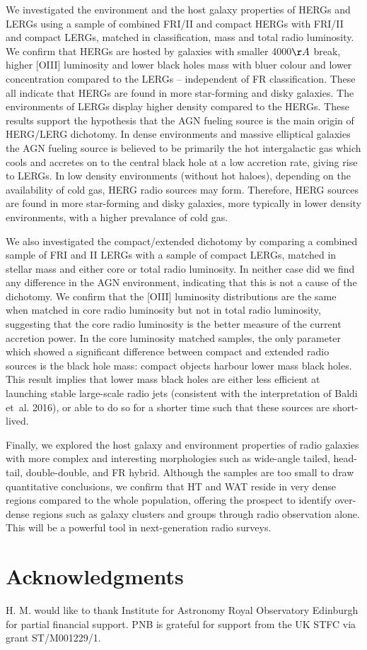 \documentclass[usenatbib]{mn2e}
\begin{document}
We investigated the environment and the host galaxy properties of HERGs
and LERGs using a sample of combined FRI/II and compact HERGs with FRI/II
and compact LERGs, matched in classification, mass and total radio
luminosity. We confirm that HERGs are hosted by galaxies with smaller
4000$\AA$ break, higher [OIII] luminosity and lower black holes mass with
bluer colour and lower concentration compared to the LERGs -- independent
of FR classification. These all indicate that HERGs are found in more
star-forming and disky galaxies. The environments of LERGs display higher
density compared to the HERGs. These results support the hypothesis that the AGN fueling
source is the main origin of HERG/LERG dichotomy. In dense environments
and massive elliptical galaxies the AGN fueling source is believed to be
primarily the hot intergalactic gas which cools and accretes on to the
central black hole at a low accretion rate, giving rise to LERGs. In low
density environments (without hot haloes), depending on the availability
of cold gas, HERG radio sources may form. Therefore, HERG sources are
found in more star-forming and disky galaxies, more typically in lower
density environments, with a higher prevalance of cold gas.

We also investigated the compact/extended dichotomy by comparing a
combined sample of FRI and II LERGs with a sample of compact LERGs,
matched in stellar mass and either core or total radio luminosity.  In
neither case did we find any difference in the AGN environment, indicating
that this is not a cause of the dichotomy. We confirm that the [OIII]
luminosity distributions are the same when matched in core radio
luminosity but not in total radio luminosity, suggesting that the core
radio luminosity is the better measure of the current accretion power. In
the core luminosity matched samples, the only parameter which showed a
significant difference between compact and extended radio sources is the
black hole mass: compact objects harbour lower mass black holes. This
result implies that lower mass black holes are either less efficient at
launching stable large-scale radio jets (consistent with the
interpretation of Baldi et~al. 2016), or able to do so for a shorter time
such that these sources are short-lived.

Finally, we explored the host galaxy and environment properties of radio
galaxies with more complex and interesting morphologies such as wide-angle tailed, 
head-tail, double-double, and FR hybrid. Although the samples are too small to draw quantitative
conclusions, we confirm that HT and WAT reside in very dense regions
compared to the whole population, offering the prospect to identify
over-dense regions such as galaxy clusters and groups through radio
observation alone. This will be a powerful tool in next-generation radio
surveys. 


\section*{Acknowledgments}
H. M. would like to thank Institute for Astronomy Royal Observatory
Edinburgh for partial financial support. PNB is grateful for support from
the UK STFC via grant ST/M001229/1.








\label{lastpage}
\end{document}
